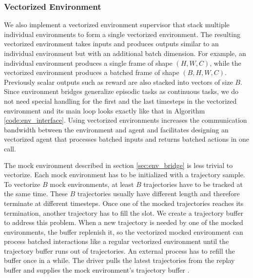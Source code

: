 \subsubsection{Vectorized Environment} \label{sec:vec_env}
We also implement a vectorized environment supervisor that stack multiple individual environments to form a single vectorized environment.
The resulting vectorized environment takes inputs and produces outputs similar to an individual environment but with an additional batch dimension.
For example, an individual environment produces a single frame of shape $(H, W, C)$, while the vectorized environment produces a batched frame of shape $(B, H, W, C)$.
Previously scalar outputs such as reward are also stacked into vectors of size $B$.
Since environment bridges generalize episodic tasks as continuous tasks, we do not need special handling for the first and the last timesteps in the vectorized environment and its main loop looks exactly like that in Algorithm \ref{code:env_interface}.
Using vectorized environments increases the communication bandwidth between the environment and agent and facilitates designing an vectorized agent that processes batched inputs and returns batched actions in one call.

The mock environment described in section \ref{sec:env_bridge} is less trivial to vectorize.
Each mock environment has to be initialized with a trajectory sample.
To vectorize $B$ mock environments, at least $B$ trajectories have to be tracked at the same time.
These $B$ trajectories usually have different length and therefore terminate at different timesteps.
Once one of the mocked trajectories reaches its termination, another trajectory has to fill the slot.
We create a trajectory buffer to address this problem.
When a new trajectory is needed by one of the mocked environments, the buffer replenish it,
so the vectorized mocked environment can process batched interactions like a regular vectorized environment until the trajectory buffer runs out of trajectories.
An external process has to refill the buffer once in a while.
The driver pulls the latest trajectories from the replay buffer and supplies the mock environment's trajectory buffer .

